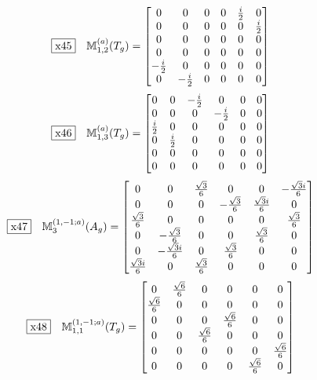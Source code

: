 \documentclass[fleqn,10pt,landscape]{jsarticle}
\begin{document}
\begin{dmath*}
\fbox{x45}\quad \mathbb{M}_{1,2}^{(a)}(T_{g})=\begin{bmatrix} 0 & 0 & 0 & 0 & \frac{i}{2} & 0 \\ 0 & 0 & 0 & 0 & 0 & \frac{i}{2} \\ 0 & 0 & 0 & 0 & 0 & 0 \\ 0 & 0 & 0 & 0 & 0 & 0 \\ - \frac{i}{2} & 0 & 0 & 0 & 0 & 0 \\ 0 & - \frac{i}{2} & 0 & 0 & 0 & 0 \end{bmatrix}
\end{dmath*}
\begin{dmath*}
\fbox{x46}\quad \mathbb{M}_{1,3}^{(a)}(T_{g})=\begin{bmatrix} 0 & 0 & - \frac{i}{2} & 0 & 0 & 0 \\ 0 & 0 & 0 & - \frac{i}{2} & 0 & 0 \\ \frac{i}{2} & 0 & 0 & 0 & 0 & 0 \\ 0 & \frac{i}{2} & 0 & 0 & 0 & 0 \\ 0 & 0 & 0 & 0 & 0 & 0 \\ 0 & 0 & 0 & 0 & 0 & 0 \end{bmatrix}
\end{dmath*}
\begin{dmath*}
\fbox{x47}\quad \mathbb{M}_{3}^{(1,-1;a)}(A_{g})=\begin{bmatrix} 0 & 0 & \frac{\sqrt{3}}{6} & 0 & 0 & - \frac{\sqrt{3} i}{6} \\ 0 & 0 & 0 & - \frac{\sqrt{3}}{6} & \frac{\sqrt{3} i}{6} & 0 \\ \frac{\sqrt{3}}{6} & 0 & 0 & 0 & 0 & \frac{\sqrt{3}}{6} \\ 0 & - \frac{\sqrt{3}}{6} & 0 & 0 & \frac{\sqrt{3}}{6} & 0 \\ 0 & - \frac{\sqrt{3} i}{6} & 0 & \frac{\sqrt{3}}{6} & 0 & 0 \\ \frac{\sqrt{3} i}{6} & 0 & \frac{\sqrt{3}}{6} & 0 & 0 & 0 \end{bmatrix}
\end{dmath*}
\begin{dmath*}
\fbox{x48}\quad \mathbb{M}_{1,1}^{(1,-1;a)}(T_{g})=\begin{bmatrix} 0 & \frac{\sqrt{6}}{6} & 0 & 0 & 0 & 0 \\ \frac{\sqrt{6}}{6} & 0 & 0 & 0 & 0 & 0 \\ 0 & 0 & 0 & \frac{\sqrt{6}}{6} & 0 & 0 \\ 0 & 0 & \frac{\sqrt{6}}{6} & 0 & 0 & 0 \\ 0 & 0 & 0 & 0 & 0 & \frac{\sqrt{6}}{6} \\ 0 & 0 & 0 & 0 & \frac{\sqrt{6}}{6} & 0 \end{bmatrix}
\end{dmath*}
\end{document}
